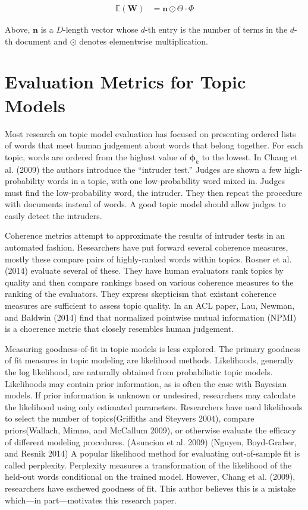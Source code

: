 \documentclass[conference,final,]{IEEEtran}
\begin{document}
\begin{align}
  \mathbb{E}(\mathbf{W}) &= \mathbf{n} \odot \Theta \cdot \Phi
\end{align}

Above, \(\mathbf{n}\) is a \(D\)-length vector whose \(d\)-th entry is
the number of terms in the \(d\)-th document and \(\odot\) denotes
elementwise multiplication.

\hypertarget{evaluation-metrics-for-topic-models}{%
\section{Evaluation Metrics for Topic
Models}\label{evaluation-metrics-for-topic-models}}

Most research on topic model evaluation has focused on presenting
ordered lists of words that meet human judgement about words that belong
together. For each topic, words are ordered from the highest value of
\(\boldsymbol\phi_k\) to the lowest. In Chang et al. (2009) the authors
introduce the ``intruder test.'' Judges are shown a few high-probability
words in a topic, with one low-probability word mixed in. Judges must
find the low-probability word, the intruder. They then repeat the
procedure with documents instead of words. A good topic model should
allow judges to easily detect the intruders.

Coherence metrics attempt to approximate the results of intruder tests
in an automated fashion. Researchers have put forward several coherence
measures, mostly these compare pairs of highly-ranked words within
topics. Rosner et al. (2014) evaluate several of these. They have human
evaluators rank topics by quality and then compare rankings based on
various coherence measures to the ranking of the evaluators. They
express skepticism that existant coherence measures are sufficient to
assess topic quality. In an ACL paper, Lau, Newman, and Baldwin (2014)
find that normalized pointwise mutual information (NPMI) is a choerence
metric that closely resembles human judgement.

Measuring goodness-of-fit in topic models is less explored. The primary
goodness of fit measures in topic modeling are likelihood methods.
Likelihoods, generally the log likelihood, are naturally obtained from
probabilistic topic models. Likelihoods may contain prior information,
as is often the case with Bayesian models. If prior information is
unknown or undesired, researchers may calculate the likelihood using
only estimated parameters. Researchers have used likelihoods to select
the number of topics(Griffiths and Steyvers 2004), compare
priors(Wallach, Mimno, and McCallum 2009), or otherwise evaluate the
efficacy of different modeling procedures. (Asuncion et al. 2009)
(Nguyen, Boyd-Graber, and Resnik 2014) A popular likelihood method for
evaluating out-of-sample fit is called perplexity. Perplexity measures a
transformation of the likelihood of the held-out words conditional on
the trained model. However, Chang et al. (2009), researchers have
eschewed goodness of fit. This author believes this is a mistake
which---in part---motivates this research paper.
\end{document}
